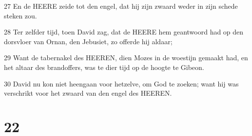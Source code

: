 \par 27 En de HEERE zeide tot den engel, dat hij zijn zwaard weder in zijn schede steken zou.
\par 28 Ter zelfder tijd, toen David zag, dat de HEERE hem geantwoord had op den dorsvloer van Ornan, den Jebusiet, zo offerde hij aldaar;
\par 29 Want de tabernakel des HEEREN, dien Mozes in de woestijn gemaakt had, en het altaar des brandoffers, was te dier tijd op de hoogte te Gibeon.
\par 30 David nu kon niet heengaan voor hetzelve, om God te zoeken; want hij was verschrikt voor het zwaard van den engel des HEEREN.

\chapter{22}

